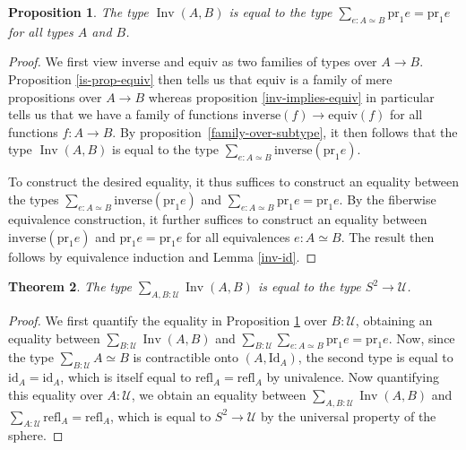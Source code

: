 \documentclass{article}
\theoremstyle{definition}
\theoremstyle{plain}
\newtheorem{theorem}{Theorem}
\newtheorem{proposition}[theorem]{Proposition}
\newcommand{\id}{\mathrm{id}}
\newcommand{\Id}{\mathrm{Id}}
\newcommand{\inverse}{\mathrm{inverse}}
\newcommand{\isequiv}{\mathrm{equiv}}
\newcommand{\pr}{\mathrm{pr}}
\newcommand{\refl}{\mathrm{refl}}
\newcommand{\sphere}{S^{2}}
\newcommand{\U}{\mathcal{U}}
\DeclareMathOperator{\inv}{Inv}
\begin{document}
\pagebreak

\begin{proposition}
  \label{inv-is-looped-equiv}
  The type \(\inv(A, B)\) is equal to the type \(\sum_{e : A \simeq B} \pr_{1}e = \pr_{1}e\)
  for all types \(A\) and \(B\).
\end{proposition}

\begin{proof}
  We first view \(\inverse\) and \(\isequiv\) as two families of types over \(A \to B\).
  Proposition \ref{is-prop-equiv} then tells us that \(\isequiv\) is a family
  of mere propositions over \(A \to B\) whereas proposition \ref{inv-implies-equiv} in
  particular tells us that we have a family of functions \(\inverse(f) \to \isequiv(f)\) for
  all functions \(f : A \to B\). By proposition~\ref{family-over-subtype}, it then follows
  that the type \(\inv(A, B)\) is equal to the type
  \(\sum_{e : A \simeq B} \inverse(\pr_{1}e)\).

  To construct the desired equality, it thus suffices to construct an equality between the
  types \(\sum_{e : A \simeq B} \inverse(\pr_{1}e)\) and
  \(\sum_{e : A \simeq B} \pr_{1}e = \pr_{1}e\). By the fiberwise
  equivalence construction, it further suffices to construct an equality between
  \(\inverse(\pr_{1}e)\) and \(\pr_{1}e = \pr_{1}e\) for all equivalences \(e : A \simeq B\).
  The result then follows by equivalence induction and Lemma \ref{inv-id}.
\end{proof}

\begin{theorem}
  The type \(\sum_{A, B : \U}\inv(A, B)\) is equal to the type \(\sphere \to \U\).
\end{theorem}

\begin{proof}
  We first quantify the equality in Proposition
  \ref{inv-is-looped-equiv} over \(B : \U\), obtaining an equality between
  \(\sum_{B : \U}\inv(A, B)\) and \(\sum_{B : \U}\sum_{e : A \simeq B}\pr_{1}e = \pr_{1}e\).
  Now, since the type \(\sum_{B : \U}A \simeq B\) is contractible onto
  \(\left(A, \Id_{A}\right)\), the second type is equal to \(\id_{A} = \id_{A}\), which is
  itself equal to \(\refl_{A} = \refl_{A}\) by univalence. Now quantifying this equality
  over \(A : \U\), we obtain an equality between \(\sum_{A, B : \U}\inv(A, B)\) and
  \(\sum_{A : \U}\refl_{A} = \refl_{A}\), which is equal to \(\sphere \to \U\) by the
  universal property of the sphere.
\end{proof}
\end{document}
